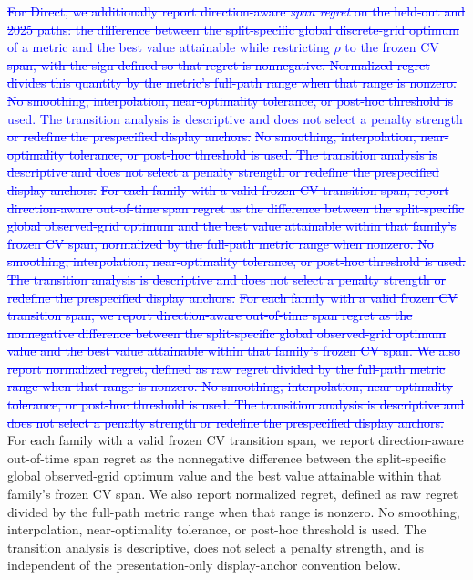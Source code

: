 \documentclass[10pt]{article}
\theoremstyle{definition}
\newcommand{\1}{\mathbf{1}}
\newcommand{\oldtext}[1]{\textcolor{blue}{\sout{#1}}}
\newcommand{\latesttext}[1]{\textcolor{latestPurple}{#1}}
\begin{document}
\oldtext{For Direct, we additionally report direction-aware \emph{span regret} on the held-out and 2025 paths: the difference between the split-specific global discrete-grid optimum of a metric and the best value attainable while restricting $\rho$ to the frozen CV span, with the sign defined so that regret is nonnegative. Normalized regret divides this quantity by the metric's full-path range when that range is nonzero. No smoothing, interpolation, near-optimality tolerance, or post-hoc threshold is used. The transition analysis is descriptive and does not select a penalty strength or redefine the prespecified display anchors.}
\oldtext{No smoothing, interpolation, near-optimality tolerance, or post-hoc threshold is used. The transition analysis is descriptive and does not select a penalty strength or redefine the prespecified display anchors.}
\oldtext{For each family with a valid frozen CV transition span, report direction-aware out-of-time span regret as the difference between the split-specific global observed-grid optimum and the best value attainable within that family's frozen CV span, normalized by the full-path metric range when nonzero. No smoothing, interpolation, near-optimality tolerance, or post-hoc threshold is used. The transition analysis is descriptive and does not select a penalty strength or redefine the prespecified display anchors.}
\oldtext{For each family with a valid frozen CV transition span, we report direction-aware out-of-time span regret as the nonnegative difference between the split-specific global observed-grid optimum value and the best value attainable within that family's frozen CV span. We also report normalized regret, defined as raw regret divided by the full-path metric range when that range is nonzero. No smoothing, interpolation, near-optimality tolerance, or post-hoc threshold is used. The transition analysis is descriptive and does not select a penalty strength or redefine the prespecified display anchors.}
\latesttext{For each family with a valid frozen CV transition span, we report direction-aware out-of-time span regret as the nonnegative difference between the split-specific global observed-grid optimum value and the best value attainable within that family's frozen CV span. We also report normalized regret, defined as raw regret divided by the full-path metric range when that range is nonzero. No smoothing, interpolation, near-optimality tolerance, or post-hoc threshold is used. The transition analysis is descriptive, does not select a penalty strength, and is independent of the presentation-only display-anchor convention below.}
\end{document}

